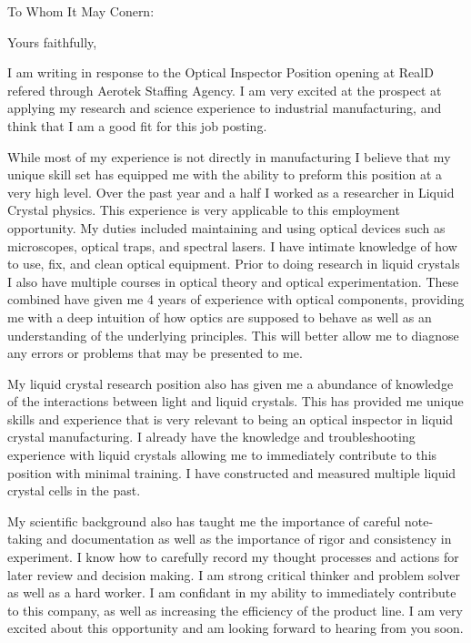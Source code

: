 \documentclass[11pt,a4paper,sans]{moderncv}        %
\begin{document}
\date{\today}
\opening{To Whom It May Conern:}
\closing{Yours faithfully,}
\makelettertitle
I am writing in response to the Optical Inspector Position opening at RealD refered through Aerotek Staffing Agency. I am very excited at the prospect at applying my research and science experience to industrial manufacturing, and think that I am a good fit for this job posting.

While most of my experience is not directly in manufacturing I believe that my unique skill set has equipped me with the ability to preform this position at a very high level. Over the past year and a half I worked as a researcher in Liquid Crystal physics. This experience is very applicable to this employment opportunity. My duties included maintaining and using optical devices such as microscopes, optical traps, and spectral lasers. I have intimate knowledge of how to use, fix, and clean optical equipment. Prior to doing research in liquid crystals I also have multiple courses in optical theory and optical experimentation. These combined have given me 4 years of experience with optical components, providing me with a deep intuition of how optics are supposed to behave as well as an understanding of the underlying principles. This will better allow me to diagnose any errors or problems that may be presented to me.

My liquid crystal research position also has given me a abundance of knowledge of the interactions between light and liquid crystals. This has provided me unique skills and experience that is very relevant to being an optical inspector in liquid crystal manufacturing. I already have the knowledge and troubleshooting experience with liquid crystals allowing me to immediately contribute to this position with minimal training. I have constructed and measured multiple liquid crystal cells in the past.

My scientific background also has taught me the importance of careful note-taking and documentation as well as the importance of rigor and consistency in experiment. I know how to carefully record my thought processes and actions for later review and decision making. I am strong critical thinker and problem solver as well as a hard worker. I am confidant in my ability to immediately contribute to this company, as well as increasing the efficiency of the product line. I am very excited about this opportunity and am looking forward to hearing from you soon.

\makeletterclosing
\end{document}
